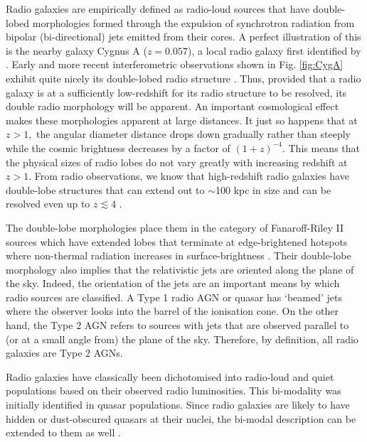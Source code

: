 Radio galaxies are empirically defined as radio-loud sources that have double-lobed morphologies formed through the expulsion of synchrotron radiation from bipolar (bi-directional) jets emitted from their cores. A perfect illustration of this is the nearby galaxy Cygnus A ($z=0.057$), a local radio galaxy first identified by \citet{JennisonDasGupta1953}. Early and more recent interferometric observations shown in Fig. \ref{fig:CygA} exhibit quite nicely its double-lobed radio structure \citep{Moffet1966,CarilliBarthel1996}. Thus, provided that a radio galaxy is at a sufficiently low-redshift for its radio structure to be resolved, its double radio morphology will be apparent. An important cosmological effect makes these morphologies apparent at large distances. It just so happens that at $z > 1,$ the angular diameter distance drops down gradually rather than steeply while the cosmic brightness decreases by a factor of $(1+z)^{-4}.$ This means that the physical sizes of radio lobes do not vary greatly with increasing redshift at $z > 1.$ From radio observations, we know that high-redshift radio galaxies have double-lobe structures that can extend out to $\sim$100 kpc in size and can be resolved even up to $z \lesssim 4$ \citep{Miley1980,carilli1997,pentericci1999}.  

The double-lobe morphologies place them in the category of Fanaroff-Riley II sources which have extended lobes that terminate at edge-brightened hotspots where non-thermal radiation increases in surface-brightness \citep{FanaroffRiley1974}. Their double-lobe morphology also implies that the relativistic jets are oriented along the plane of the sky. Indeed, the orientation of the jets are an important means by which radio sources are classified. A Type 1 radio AGN or quasar has `beamed' jets where the observer looks into the barrel of the ionisation cone. On the other hand, the Type 2 AGN refers to sources with jets that are observed parallel to (or at a small angle from) the plane of the sky. Therefore, by definition, all radio galaxies are Type 2 AGNs. 

Radio galaxies have classically been dichotomised into radio-loud and quiet populations based on their observed radio luminosities. This bi-modality was initially identified in quasar populations. Since radio galaxies are likely to have hidden or dust-obscured quasars at their nuclei, the bi-modal description can be extended to them as well \citep{vernet2001}. 

